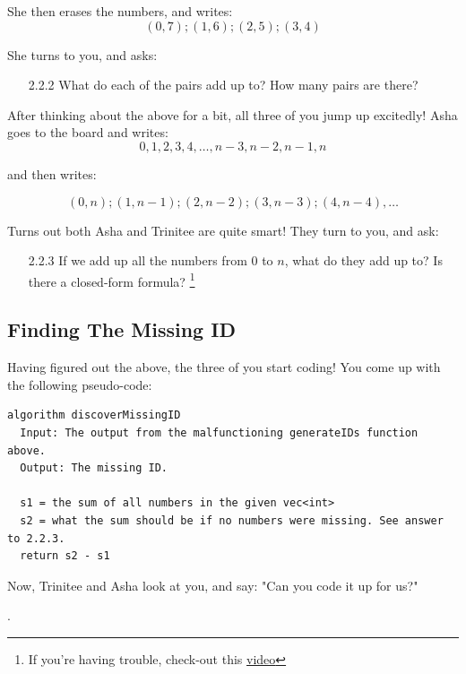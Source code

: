 \documentclass [12pt]{article}
\begin{document}
She then erases the numbers, and writes:
$$
(0, 7); (1, 6); (2, 5); (3, 4)
$$

She turns to you, and asks:

\begin{enumerate}
    \item [2.2.2]  What do each of the pairs add up to? How many pairs are there?
\end{enumerate}

After thinking about the above for a bit, all three of you jump up excitedly! Asha goes to the board and writes:
$$
0, 1, 2, 3, 4, \dots, n-3, n-2, n-1, n
$$

and then writes:

$$
(0, n); (1, n-1); (2, n-2); (3, n-3); (4, n-4), \dots
$$

Turns out both Asha and Trinitee are quite smart! They turn to you, and ask:

\begin{enumerate}
    \item [2.2.3]  If we add up all the numbers from $0$ to $n$, what do they add up to? Is there a closed-form formula? \footnote{If you're having trouble, check-out this \href{https://www.youtube.com/results?search_query=sum+of+first+n+terms}{video}}
\end{enumerate}



\subsection{Finding The Missing ID}
 Having figured out the above, the three of you start coding! You come up with the following pseudo-code:

\begin{verbatim}
algorithm discoverMissingID
  Input: The output from the malfunctioning generateIDs function above.
  Output: The missing ID.

  s1 = the sum of all numbers in the given vec<int>
  s2 = what the sum should be if no numbers were missing. See answer to 2.2.3.
  return s2 - s1
\end{verbatim}

Now, Trinitee and Asha look at you, and say: "Can you code it up for us?"

.
\end{document}
